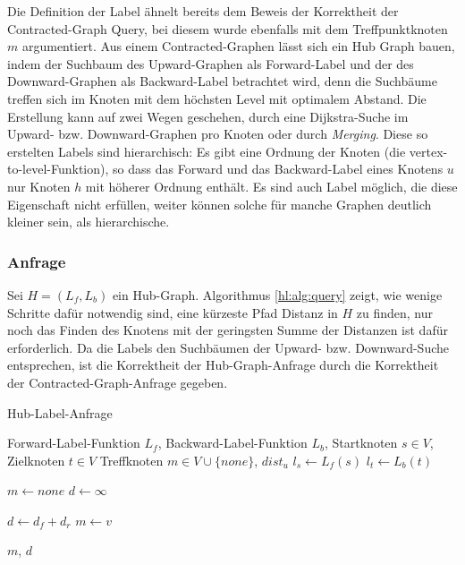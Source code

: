 Die Definition der Label ähnelt bereits dem Beweis der Korrektheit der Contracted-Graph Query, bei diesem wurde ebenfalls mit dem Treffpunktknoten $m$ argumentiert.
Aus einem Contracted-Graphen lässt sich ein Hub Graph bauen, indem der Suchbaum des Upward-Graphen als Forward-Label und der des Downward-Graphen als Backward-Label betrachtet wird, denn die Suchbäume treffen sich im Knoten mit dem höchsten Level mit optimalem Abstand.
Die Erstellung kann auf zwei Wegen geschehen, durch eine Dijkstra-Suche im Upward- bzw. Downward-Graphen pro Knoten oder durch \emph{Merging}.
Diese so erstelten Labels sind hierarchisch: Es gibt eine Ordnung der Knoten (die vertex-to-level-Funktion), so dass das Forward und das Backward-Label eines Knotens $u$ nur Knoten $h$ mit höherer Ordnung enthält.
Es sind auch Label möglich, die diese Eigenschaft nicht erfüllen, weiter können solche für manche Graphen deutlich kleiner sein, als hierarchische.\cite{goldberg2013separating}

\subsubsection{Anfrage}

Sei $H = (L_f, L_b)$ ein Hub-Graph.
Algorithmus \ref{hl:alg:query} zeigt, wie wenige Schritte dafür notwendig sind, eine kürzeste Pfad Distanz in $H$ zu finden, nur noch das Finden des Knotens mit der geringsten Summe der Distanzen ist dafür erforderlich.
Da die Labels den Suchbäumen der Upward- bzw. Downward-Suche entsprechen, ist die Korrektheit der Hub-Graph-Anfrage durch die Korrektheit der Contracted-Graph-Anfrage gegeben.

\begin{algorithm}[ht]
  \caption{Hub-Label-Anfrage}
  \begin{algorithmic}[1]
    \Require Forward-Label-Funktion $L_f$, Backward-Label-Funktion $L_b$, Startknoten $s \in V$, Zielknoten $t \in V$
    \Ensure Treffknoten $m \in V \cup \{ {none} \}$, ${dist}_u$
    \State $l_s \leftarrow L_f (s)$
    \State $l_t \leftarrow L_b (t)$

    \State
    \State $m \leftarrow {none}$
    \State $d \leftarrow \infty$

    \State $d \leftarrow d_f + d_r$
    \State $m \leftarrow v$
    \EndIf
    \EndFor

    \State
    \State \Return $m$, $d$
  \end{algorithmic}
  \label{hl:alg:query}
\end{algorithm}

